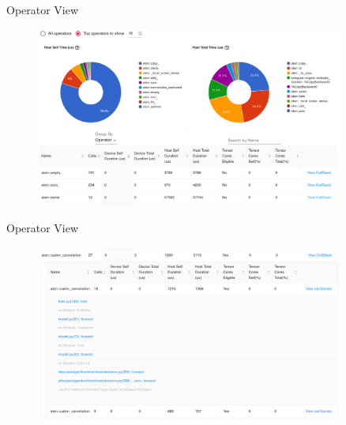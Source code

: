 \documentclass[compress,aspectratio=169]{beamer}
\begin{document}
\begin{frame}{Operator View}
    \vspace{-1em}
\begin{center}
    \begin{figure}
        \includegraphics[width=0.9\textwidth]{./assets/scap_gtx1080_profiler-torch_batch-size-64_14650758_operator-view}
    \end{figure}
    \end{center}
\end{frame}

\begin{frame}{Operator View}
    \vspace{-1em}
\begin{center}
    \begin{figure}
        \includegraphics[width=0.9\textwidth]{./assets/scap_gtx1080_profiler-torch_batch-size-64_14650758_operator-view-details}
    \end{figure}
    \end{center}
\end{frame}
\end{document}

